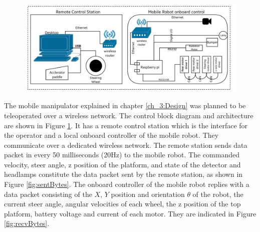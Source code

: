 \begin{figure}
	\includegraphics[width=\linewidth,keepaspectratio]{Chapter3/fig/controlblock}
	\label{fig:ControlBlockDiag} 
\end{figure} 
The mobile manipulator explained in chapter \ref{ch_3:Design} was planned to be teleoperated over a wireless network. The control block diagram and architecture are shown in Figure \ref{fig:ControlBlockDiag}. It has a remote control station which is the interface for the operator and a local onboard controller of the mobile robot. They  communicate over a dedicated wireless network. The remote station sends data packet in every  50 milliseconds (20Hz) to the mobile robot. The commanded velocity, steer angle,  z position of the platform, and  state of the detector and headlamps constitute the data packet sent by the remote station, as shown in Figure \ref{fig:sentBytes}. The onboard controller of the mobile robot replies with a data packet consisting of the $X$, $Y$ position and orientation $\theta$ of the robot, the current steer angle, angular velocities of each wheel, the z position of the top platform,  battery voltage  and current of each motor. They are indicated in Figure \ref{fig:recvBytes}.
